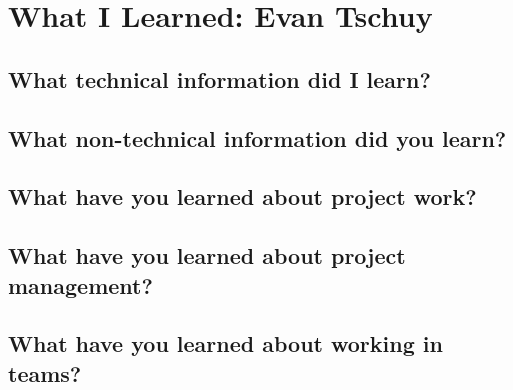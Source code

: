 \documentclass[onecolumn, draftclsnofoot,10pt, compsoc]{IEEEtran}
\begin{document}
\section{What I Learned: Evan Tschuy}

\subsection{What technical information did I learn?}

\subsection{What non-technical information did you learn?}

\subsection{What have you learned about project work?}

\subsection{What have you learned about project management?}

\subsection{What have you learned about working in teams?}
\end{document}
